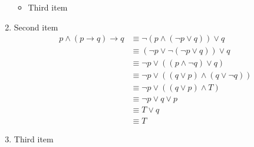 \documentclass[a5paper,14pt]{memoir}
\begin{document}
\begin{enumerate}
\begin{itemize}
          \item Third item
        \end{itemize}
  \item Second item
        \begin{align*}
          p ∧ (p → q) → q & ≡ ¬(p ∧ (¬p ∨ q)) ∨ q                    \\
                          & ≡ (\neg p \lor \neg (\neg p \lor q)) ∨ q \\
                          & ≡ ¬p ∨ ((p ∧ ¬q) ∨ q)                    \\
                          & ≡ ¬p ∨ ((q ∨ p) ∧ (q ∨ ¬q))              \\
                          & ≡ ¬p ∨ ((q ∨ p) ∧ T)                     \\
                          & ≡ ¬p ∨ q ∨ p                             \\
                          & ≡ T ∨ q                                  \\
                          & ≡ T
        \end{align*}
  \item Third item
\end{enumerate}
\end{document}
